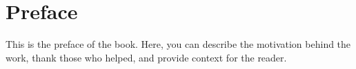 \chapter*{Preface}
This is the preface of the book. Here, you can describe the motivation behind the work, thank those who helped, and provide context for the reader.
